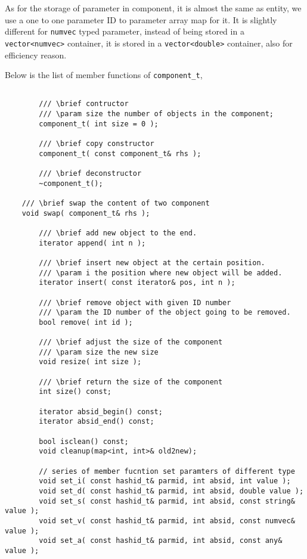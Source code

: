 \documentclass[letterpaper]{book}
\begin{document}
As for the storage of parameter in component, it is almost the same as entity, we use a one to one parameter ID to 
parameter array map for it. It is slightly different for \lstinline$numvec$ typed parameter, instead of being stored in
a \lstinline$vector<numvec>$ container, it is stored in a \lstinline$vector<double>$ container, also for efficiency 
reason.

Below is the list of member functions of \lstinline$component_t$, 

\begin{lstlisting}

        /// \brief contructor
        /// \param size the number of objects in the component;
        component_t( int size = 0 );
        
        /// \brief copy constructor
        component_t( const component_t& rhs );

        /// \brief deconstructor
        ~component_t();

	/// \brief swap the content of two component
	void swap( component_t& rhs );
        
        /// \brief add new object to the end.
        iterator append( int n );

        /// \brief insert new object at the certain position.
        /// \param i the position where new object will be added.
        iterator insert( const iterator& pos, int n );

        /// \brief remove object with given ID number
        /// \param the ID number of the object going to be removed.
        bool remove( int id );
        
        /// \brief adjust the size of the component
        /// \param size the new size
        void resize( int size );

        /// \brief return the size of the component
        int size() const;

        iterator absid_begin() const; 
        iterator absid_end() const; 

        bool isclean() const; 
        void cleanup(map<int, int>& old2new); 

        // series of member fucntion set paramters of different type
        void set_i( const hashid_t& parmid, int absid, int value );  
        void set_d( const hashid_t& parmid, int absid, double value );  
        void set_s( const hashid_t& parmid, int absid, const string& value );  
        void set_v( const hashid_t& parmid, int absid, const numvec& value );  
        void set_a( const hashid_t& parmid, int absid, const any& value );  


\end{lstlisting}
\end{document}
